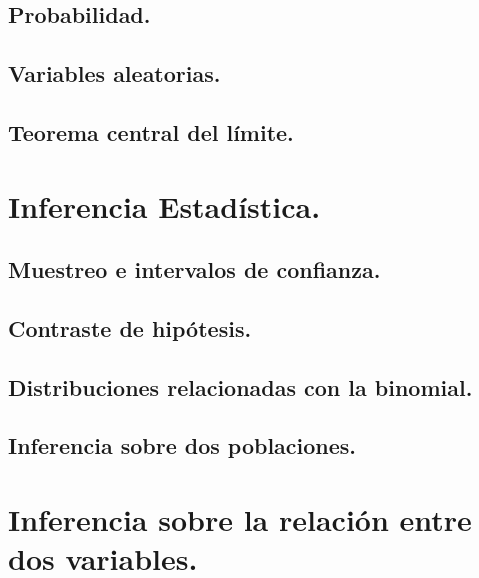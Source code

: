 \documentclass[10pt,a4paper]{book}
\begin{document}
\chapter{Probabilidad.}
\label{cap:Probabilidad}


\chapter{Variables aleatorias.}
\label{cap:VariablesAleatorias}


\chapter{Teorema central del límite.}
\label{cap:TeoremaCentralLimite}



\part{Inferencia Estadística.}
\label{parte:InferenciaEstadistica}


\chapter{Muestreo e intervalos de confianza.}
\label{cap:IntervalosConfianza}


\chapter{Contraste de hipótesis.}
\label{cap:ContrasteHipotesis}



\chapter{Distribuciones relacionadas con la binomial.}
\label{cap:DistribucionesRelacionadasBinomial}


\chapter{Inferencia sobre dos poblaciones.}
\label{cap:Inferencia2Poblaciones}



\part{Inferencia sobre la relación entre dos variables.}
\label{parte:InferenciaRelacion2Variables}

\end{document}
